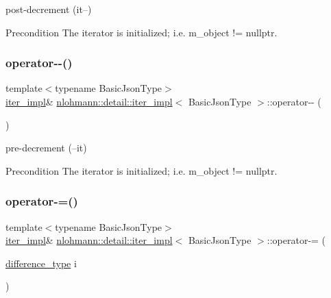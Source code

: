 post-\/decrement (it--) 

\begin{DoxyPrecond}{Precondition}
The iterator is initialized; i.\+e. {\ttfamily m\+\_\+object != nullptr}. 
\end{DoxyPrecond}
\mbox{\label{classnlohmann_1_1detail_1_1iter__impl_a84e689fb581d651d130039f7cb81494a}} 
\subsubsection{\texorpdfstring{operator-\/-\/()}{operator--()}\hspace{0.1cm}{\footnotesize\ttfamily [2/2]}}
{\footnotesize\ttfamily template$<$typename Basic\+Json\+Type$>$ \\
\mbox{\hyperlink{classnlohmann_1_1detail_1_1iter__impl}{iter\+\_\+impl}}\& \mbox{\hyperlink{classnlohmann_1_1detail_1_1iter__impl}{nlohmann\+::detail\+::iter\+\_\+impl}}$<$ Basic\+Json\+Type $>$\+::operator-\/-\/ (\begin{DoxyParamCaption}{ }\end{DoxyParamCaption})\hspace{0.3cm}{\ttfamily [inline]}}



pre-\/decrement (--it) 

\begin{DoxyPrecond}{Precondition}
The iterator is initialized; i.\+e. {\ttfamily m\+\_\+object != nullptr}. 
\end{DoxyPrecond}
\mbox{\label{classnlohmann_1_1detail_1_1iter__impl_abcc9d51bc52f2e8483bbe4018f05e978}} 
\subsubsection{\texorpdfstring{operator-\/=()}{operator-=()}}
{\footnotesize\ttfamily template$<$typename Basic\+Json\+Type$>$ \\
\mbox{\hyperlink{classnlohmann_1_1detail_1_1iter__impl}{iter\+\_\+impl}}\& \mbox{\hyperlink{classnlohmann_1_1detail_1_1iter__impl}{nlohmann\+::detail\+::iter\+\_\+impl}}$<$ Basic\+Json\+Type $>$\+::operator-\/= (\begin{DoxyParamCaption}\item[{\mbox{\hyperlink{classnlohmann_1_1detail_1_1iter__impl_a2f7ea9f7022850809c60fc3263775840}{difference\+\_\+type}}}]{i }\end{DoxyParamCaption})\hspace{0.3cm}{\ttfamily [inline]}}



